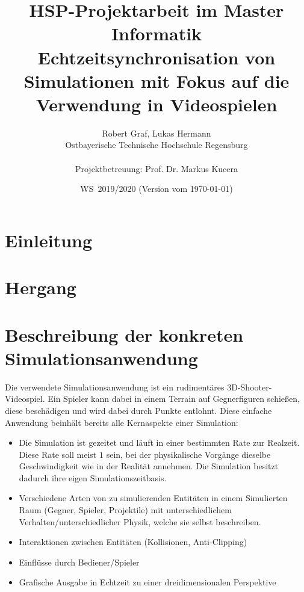 \documentclass[11pt,twoside,a4paper]{article}
\begin{document}
\title{HSP-Projektarbeit im Master Informatik \\
\small Echtzeitsynchronisation von Simulationen mit Fokus auf die Verwendung in Videospielen}
\author{Robert Graf, Lukas Hermann\\
  Ostbayerische Technische Hochschule Regensburg\\
  \\
  Projektbetreuung: Prof. Dr. Markus Kucera
}
  
\date{WS\, 2019/2020 (Version vom \today)}

\maketitle

\newpage
\tableofcontents
\newpage



\section{Einleitung}


\section{Hergang}


\section{Beschreibung der konkreten Simulationsanwendung}
Die verwendete Simulationsanwendung ist ein rudimentäres 3D-Shooter-Videospiel. Ein Spieler kann dabei in einem Terrain auf Gegnerfiguren schießen, diese beschädigen und wird dabei durch Punkte entlohnt. Diese einfache Anwendung beinhält bereits alle Kernaspekte einer Simulation:
\begin{itemize}
\item Die Simulation ist gezeitet und läuft in einer bestimmten Rate zur Realzeit. Diese Rate soll meist $1$ sein, bei der physikalische Vorgänge dieselbe Geschwindigkeit wie in der Realität annehmen. Die Simulation besitzt dadurch ihre eigen Simulationszeitbasis.
\item Verschiedene Arten von zu simulierenden Entitäten in einem Simulierten Raum (Gegner, Spieler, Projektile) mit unterschiedlichem Verhalten/unterschiedlicher Physik, welche sie selbst beschreiben.
\item Interaktionen zwischen Entitäten (Kollisionen, Anti-Clipping)
\item Einflüsse durch Bediener/Spieler
\item Grafische Ausgabe in Echtzeit zu einer dreidimensionalen Perspektive
\end{itemize}
\end{document}
